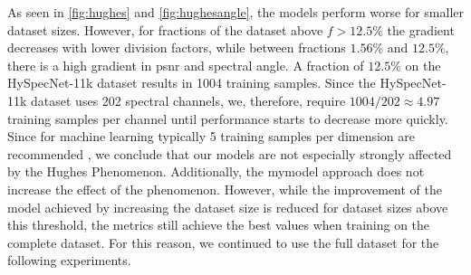 As seen in \autoref{fig:hughes} and \autoref{fig:hughesangle}, the models perform worse for smaller dataset sizes. However, for fractions of the dataset above $f > 12.5\%$ the gradient decreases with lower division factors, while between fractions $1.56\%$ and $12.5\%$, there is a high gradient in \ac{psnr} and spectral angle. A fraction of $12.5\%$ on the HySpecNet-11k dataset results in 1004 training samples. Since the HySpecNet-11k dataset uses 202 spectral channels, we, therefore, require $1004/202 \approx 4.97$ training samples per channel until performance starts to decrease more quickly. Since for machine learning typically 5 training samples per dimension are recommended \citep{theodoridis_pattern_2009}, we conclude that our models are not especially strongly affected by the Hughes Phenomenon. Additionally, the \ac{mymodel} approach does not increase the effect of the phenomenon. However, while the improvement of the model achieved by increasing the dataset size is reduced for dataset sizes above this threshold, the metrics still achieve the best values when training on the complete dataset. For this reason, we continued to use the full dataset for the following experiments.
